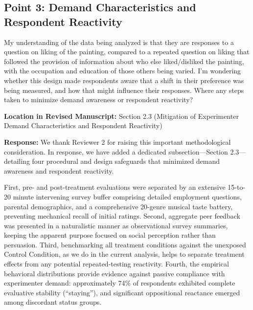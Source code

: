 \documentclass[11pt, letterpaper]{article}
\begin{document}
\vspace{10pt}

\subsection*{Point 3: Demand Characteristics and Respondent Reactivity}

\begin{reviewercomment}
My understanding of the data being analyzed is that they are responses to a question on liking of the painting, compared to a repeated question on liking that followed the provision of information about who else liked/disliked the painting, with the occupation and education of those others being varied. I'm wondering whether this design made respondents aware that a shift in their preference was being measured, and how that might influence their responses. Where any steps taken to minimize demand awareness or respondent reactivity?
\end{reviewercomment}

\textbf{Location in Revised Manuscript:} Section 2.3 (Mitigation of Experimenter Demand Characteristics and Respondent Reactivity)

\textbf{Response:}
We thank Reviewer 2 for raising this important methodological consideration. In response, we have added a dedicated subsection---Section 2.3---detailing four procedural and design safeguards that minimized demand awareness and respondent reactivity.

First, pre- and post-treatment evaluations were separated by an extensive 15-to-20 minute intervening survey buffer comprising detailed employment questions, parental demographics, and a comprehensive 20-genre musical taste battery, preventing mechanical recall of initial ratings. Second, aggregate peer feedback was presented in a naturalistic manner as observational survey summaries, keeping the apparent purpose focused on social perception rather than persuasion. Third, benchmarking all treatment conditions against the unexposed Control Condition, as we do in the current analysis, helps to separate treatment effects from any potential repeated-testing reactivity. Fourth, the empirical behavioral distributions provide evidence against passive compliance with experimenter demand: approximately 74\% of respondents exhibited complete evaluative stability (``staying''), and significant oppositional reactance emerged among discordant status groups.

\vspace{10pt}
\end{document}
